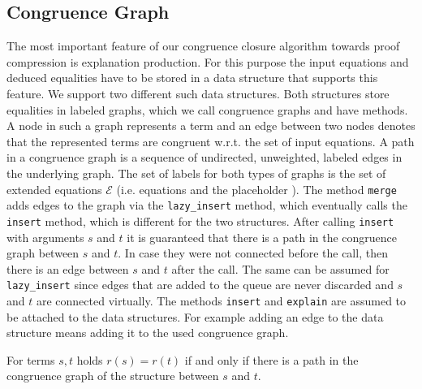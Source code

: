 \subsection*{Congruence Graph}
\label{sec:congruencegraph}
The most important feature of our congruence closure algorithm towards proof compression is explanation production.
For this purpose the input equations and deduced equalities have to be stored in a data structure that supports this feature.
We support two different such data structures.
Both structures store equalities in labeled graphs, which we call congruence graphs and have methods.
A node in such a graph represents a term and an edge between two nodes denotes that the represented terms are congruent w.r.t. the set of input equations.
A path in a congruence graph is a sequence of undirected, unweighted, labeled edges in the underlying graph.
The set of labels for both types of graphs is the set of extended equations $\mathcal{E}$ (i.e. equations and the placeholder \smiley).
The method \texttt{merge} adds edges to the graph via the \texttt{lazy\_insert} method, which eventually calls the \texttt{insert} method, which is different for the two structures.
After calling \texttt{insert} with arguments $s$ and $t$ it is guaranteed that there is a path in the congruence graph between $s$ and $t$.
In case they were not connected before the call, then there is an edge between $s$ and $t$ after the call.
The same can be assumed for \texttt{lazy\_insert} since edges that are added to the queue are never discarded and $s$ and $t$ are connected virtually.
The methods \texttt{insert} and \texttt{explain} are assumed to be attached to the data structures.
For example adding an edge to the data structure means adding it to the used congruence graph.

\begin{invariant}[Paths]

For terms $s, t$ holds $r(s) = r(t)$ if and only if there is a path in the congruence graph of the structure between $s$ and $t$.

\end{invariant}

